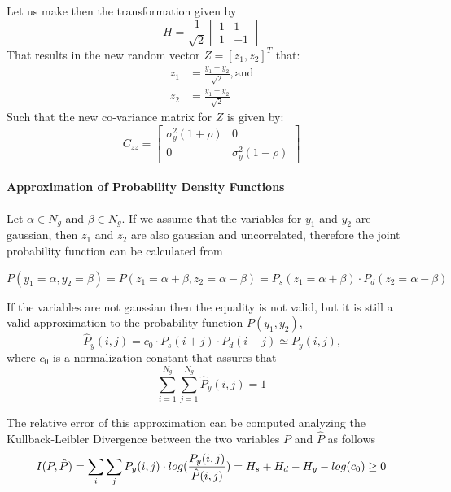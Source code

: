 Let us make then the transformation given by
\begin{equation}
H =\frac{1}{\sqrt{2}} 
\begin{bmatrix}
1&1\\
1&-1
\end{bmatrix}{}
\end{equation}
That results in the new random vector $Z=[z_1, z_2]^T$ that:
\begin{equation}
\begin{split}
z_1 &=\frac{y_1+y_2}{\sqrt{2}}, \text{and}\\
z_2 &= \frac{y_1-y_2}{\sqrt{2}}
\end{split}
\end{equation}
Such that the new co-variance matrix for $Z$ is given by:
\begin{equation}
C_{zz}=
    \begin{bmatrix}
    \sigma_y^2 (1+\rho) & 0\\
    0 & \sigma_y^2 (1-\rho)
    \end{bmatrix}{}
\end{equation}{}

\paragraph{Approximation of Probability Density Functions}
Let $\alpha \in N_g$ and $\beta \in N_g$.
If we assume that the variables for $y_1$ and $y_2$ are gaussian, then $z_1$ and $z_2$ are also gaussian and uncorrelated, therefore the joint probability function can be calculated from

\begin{equation}
P(y_1=\alpha, y_2=\beta) = P(z_1=\alpha + \beta, z_2=\alpha - \beta) = P_s(z_1=\alpha+\beta)\cdot P_d(z_2=\alpha-\beta) 
\end{equation}

If the variables are not gaussian then the equality is not valid, but it is still a valid approximation to the probability function $P(y_1, y_2)$,
\begin{equation}
    \hat{P}_y(i,j) = c_0\cdot P_s(i+j) \cdot P_d(i-j) \simeq P_y(i,j)\text{,}
    \label{approximation_gaussian}
\end{equation}{}
where $c_0$ is a normalization constant that assures that
\begin{equation}
    \sum_{i=1}^{N_g}\sum_{j=1}^{N_g} \hat{P}_y(i,j) = 1
\end{equation}

The relative error of this approximation can be computed analyzing the Kullback-Leibler Divergence between the two variables $P$ and $\hat{P}$ as follows
\begin{equation}
\label{eq:divergence}
    I(P, \hat{P}) = \sum_i\sum_j P_y(i,j)\cdot log(\frac{P_y(i,j)}{\hat{P}(i,j)}) = \\
    H_s + H_d - H_y -log(c_0)\geq0
\end{equation}

